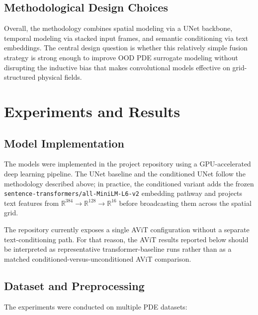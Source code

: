 \documentclass[
]{article}
\begin{document}
\subsection{Methodological Design
Choices}\label{methodological-design-choices}

Overall, the methodology combines spatial modeling via a UNet backbone,
temporal modeling via stacked input frames, and semantic conditioning
via text embeddings. The central design question is whether this
relatively simple fusion strategy is strong enough to improve OOD PDE
surrogate modeling without disrupting the inductive bias that makes
convolutional models effective on grid-structured physical fields.

\section{Experiments and Results}\label{experiments-and-results}

\subsection{Model Implementation}\label{model-implementation}

The models were implemented in the project repository using a
GPU-accelerated deep learning pipeline. The UNet baseline and the
conditioned UNet follow the methodology described above; in practice,
the conditioned variant adds the frozen
\texttt{sentence-transformers/all-MiniLM-L6-v2} embedding pathway and
projects text features from
\(\mathbb{R}^{384} \rightarrow \mathbb{R}^{128} \rightarrow \mathbb{R}^{16}\)
before broadcasting them across the spatial grid.

The repository currently exposes a single AViT configuration without a
separate text-conditioning path. For that reason, the AViT results
reported below should be interpreted as representative
transformer-baseline runs rather than as a matched
conditioned-versus-unconditioned AViT comparison.

\subsection{Dataset and Preprocessing}\label{dataset-and-preprocessing}

The experiments were conducted on multiple PDE datasets:
\end{document}
